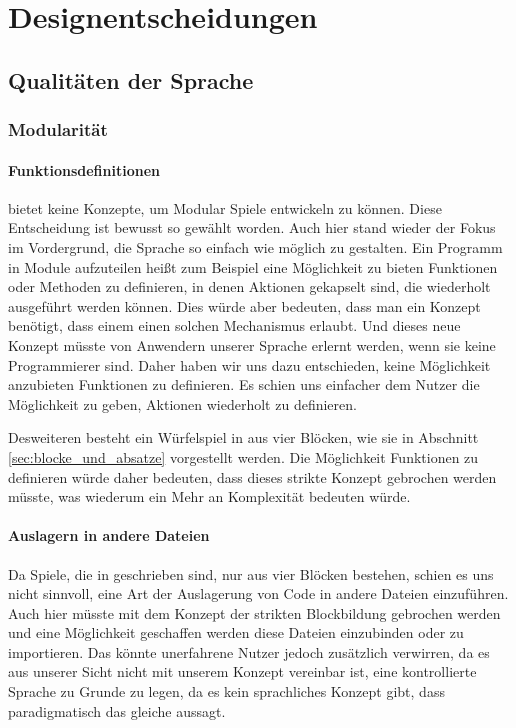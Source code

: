 
\chapter{Designentscheidungen}
\label{cha:designentscheidungen}

\section{Qualitäten der Sprache} %
\label{sec:qualitaten_der_sprache}


\subsection{Modularität} %
\label{sub:modularitat}
\subsubsection{Funktionsdefinitionen}
\label{subsub:funktionsdefinitionen}
	\dg bietet keine Konzepte, um Modular Spiele entwickeln zu können. Diese Entscheidung ist bewusst so gewählt worden. Auch hier stand wieder der Fokus im Vordergrund, die Sprache so einfach wie möglich zu gestalten. Ein Programm in Module aufzuteilen heißt zum Beispiel eine Möglichkeit zu bieten Funktionen oder Methoden zu definieren, in denen Aktionen gekapselt sind, die wiederholt ausgeführt werden können. Dies würde aber bedeuten, dass man ein Konzept benötigt, dass einem einen solchen Mechanismus erlaubt. Und dieses neue Konzept müsste von Anwendern unserer Sprache erlernt werden, wenn sie keine Programmierer sind. Daher haben wir uns dazu entschieden, keine Möglichkeit anzubieten Funktionen zu definieren. Es schien uns einfacher dem Nutzer die Möglichkeit zu geben, Aktionen wiederholt zu definieren.

	Desweiteren besteht ein Würfelspiel in \dg aus vier Blöcken, wie sie in Abschnitt \ref{sec:blocke_und_absatze} vorgestellt werden. Die Möglichkeit Funktionen zu definieren würde daher bedeuten, dass dieses strikte Konzept gebrochen werden müsste, was wiederum ein Mehr an Komplexität bedeuten würde.
\subsubsection{Auslagern in andere Dateien}
\label{subsub:auslagern_in_andere_dateien}
	Da Spiele, die in \dg geschrieben sind, nur aus vier Blöcken bestehen, schien es uns nicht sinnvoll, eine Art der Auslagerung von Code in andere Dateien einzuführen. Auch hier müsste mit dem Konzept der strikten Blockbildung gebrochen werden und eine Möglichkeit geschaffen werden diese Dateien einzubinden oder zu importieren. Das könnte unerfahrene Nutzer jedoch zusätzlich verwirren, da es aus unserer Sicht nicht mit unserem Konzept vereinbar ist, \dg eine kontrollierte Sprache zu Grunde zu legen, da es kein sprachliches Konzept gibt, dass paradigmatisch das gleiche aussagt.

